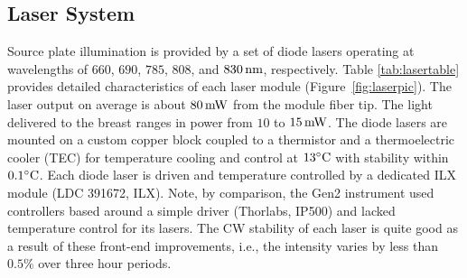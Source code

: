 \subsection{Laser System}
Source plate illumination is provided by a set of diode lasers operating at wavelengths of $660$, $690$, $785$, $808$, and $830\,{\rm nm}$, respectively. Table \ref{tab:lasertable} provides detailed characteristics of each laser module (Figure~\ref{fig:laserpic}). The laser output on average is about $80\,\rm{mW}$ from the module fiber tip. The light delivered to the breast ranges in power from $10$ to $15\,\rm{mW}$. The diode lasers are mounted on a custom copper block coupled to a thermistor and a thermoelectric cooler (TEC) for temperature cooling and control at $13^{\circ}{\rm C}$ with stability within $0.1^{\circ}{\rm C}$. Each diode laser is driven and temperature controlled by a dedicated ILX module (LDC 391672, ILX). Note, by comparison, the Gen2 instrument used controllers based around a simple driver (Thorlabs, IP500) and lacked temperature control for its lasers. The CW stability of each laser is quite good as a result of these front-end improvements, i.e., the intensity varies by less than $0.5\%$ over three hour periods. 
%

